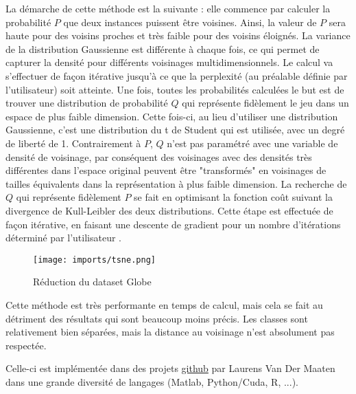 La démarche de cette méthode est la suivante : elle commence par calculer la  probabilité $P$ que deux instances puissent être voisines. Ainsi, la valeur de $P$ sera haute pour des voisins proches et très faible pour des voisins éloignés.\newline
La variance de la distribution Gaussienne est différente à chaque fois, ce qui permet de capturer la densité pour différents voisinages multidimensionnels.
Le calcul va s’effectuer de façon itérative jusqu’à ce que la perplexité (au préalable définie par l’utilisateur) soit atteinte.
\newline Une fois, toutes les probabilités calculées le but est de trouver une distribution de probabilité $Q$ qui représente fidèlement le jeu dans un espace de plus faible dimension. Cette fois-ci, au lieu d’utiliser une distribution Gaussienne, c’est une distribution du t de Student qui est utilisée, avec un degré de liberté de 1. \newline Contrairement à $P$, $Q$ n’est pas paramétré avec une variable de densité de voisinage, par conséquent des voisinages avec des densités très différentes dans l’espace original peuvent être "transformés" en  voisinages de tailles équivalents dans la représentation à plus faible dimension.
La recherche de $Q$ qui représente fidèlement $P$ se fait en optimisant la fonction coût suivant la divergence de Kull-Leibler des deux distributions. Cette étape est effectuée de façon itérative, en faisant une descente de gradient pour un nombre d’itérations déterminé par l’utilisateur \cite{van2008TSNE}.

\begin{center}
    \begin{figure}[ht!]
        \centering
        
        \texttt{[image: imports/tsne.png]}
        
        \caption{Réduction du dataset Globe}
    \end{figure}
\end{center}

Cette méthode est très performante en temps de calcul, mais cela se fait au détriment des résultats qui sont beaucoup moins précis. 
Les classes sont relativement bien séparées, mais la distance au voisinage n'est absolument pas respectée.

Celle-ci est implémentée dans des projets \href{https://lvdmaaten.github.io/tsne/}{github} par Laurens Van Der Maaten dans une grande diversité de langages (Matlab, Python/Cuda, R, ...). 

